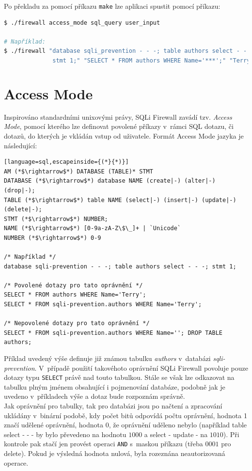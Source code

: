 Po překladu za pomocí příkazu \texttt{make} lze aplikaci spustit pomocí příkazu:

\begin{lstlisting}[language=bash]
$ ./firewall access_mode sql_query user_input

# Například:
$ ./firewall "database sqli_prevention - - -; table authors select - - -; 
              stmt 1;" "SELECT * FROM authors WHERE Name='***';" "Terry"
\end{lstlisting}

\section{Access Mode} \label{sec:6:accessmode}
Inspirováno standardními unixovými právy, SQLi Firewall zavádí tzv. \textit{Access Mode}, pomocí kterého lze definovat
povolené příkazy v~rámci SQL dotazu, či dotazů, do kterých je vkládán vstup od uživatele. Formát Access Mode jazyka je následující:

\begin{lstlisting}[language=sql,escapeinside={(*}{*)}]
AM (*$\rightarrow$*) DATABASE (TABLE)* STMT
DATABASE (*$\rightarrow$*) database NAME (create|-) (alter|-) (drop|-);
TABLE (*$\rightarrow$*) table NAME (select|-) (insert|-) (update|-) (delete|-);
STMT (*$\rightarrow$*) NUMBER;
NAME (*$\rightarrow$*) [0-9a-zA-Z\$\_]+ | `Unicode`
NUMBER (*$\rightarrow$*) 0-9

/* Například */
database sqli-prevention - - -; table authors select - - -; stmt 1;

/* Povolené dotazy pro tato oprávnění */
SELECT * FROM authors WHERE Name='Terry';
SELECT * FROM sqli-prevention.authors WHERE Name='Terry';

/* Nepovolené dotazy pro tato oprávnění */
SELECT * FROM sqli-prevention.authors WHERE Name=''; DROP TABLE authors;
\end{lstlisting}

Příklad uvedený výše definuje již známou tabulku \textit{authors} v~databázi \textit{sqli-prevention}. V~případě použití takovéhoto oprávnění SQLi 
Firewall povoluje pouze dotazy typu \texttt{SELECT} právě nad touto tabulkou. Stále se však lze odkazovat na tabulku plným jménem obsahující i 
pojmenování databáze, podobně jak je uvedeno v~příkladech výše a dotaz bude rozpoznám správně. \\

Jak oprávnění pro tabulky, tak pro databázi jsou po načtení a zpracování ukládány v~binární podobě, kdy počet bitů odpovídá počtu
oprávnění, hodnota 1 značí udělené oprávnění, hodnota 0, že oprávnění uděleno nebylo (například table select -{} -{} - by bylo převedeno
na hodnotu $1000$ a select - update - na $1010$). Při kontrole pak stačí jen provést operaci \texttt{AND} s~maskou příkazu (třeba
$0001$ pro delete). Pokud je výsledná hodnota nulová, byla rozeznána neautorizovaná operace. \\


